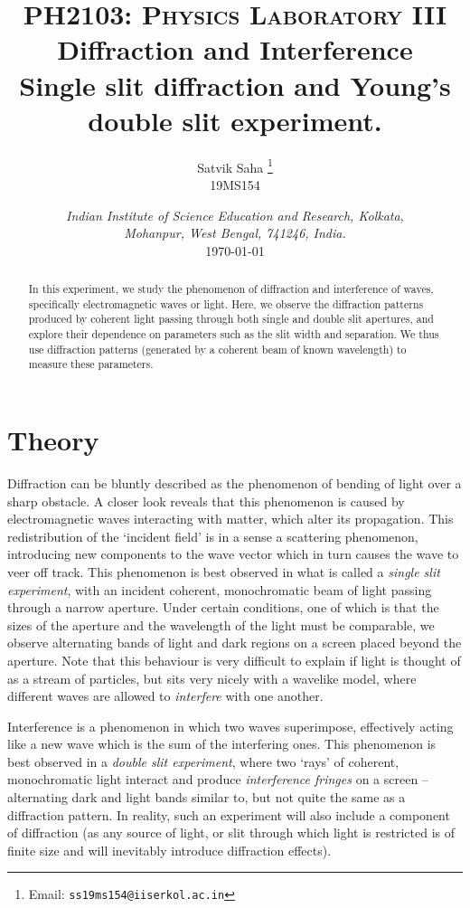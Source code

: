 \documentclass[11pt]{article}
\title{
        \Large\textsc{PH2103: Physics Laboratory III} \\
        \vspace{10pt}
        \Huge \textbf{Diffraction and Interference} \\
        \vspace{5pt}
        \large{Single slit diffraction and Young's double slit experiment.}
}
\author{
        \large Satvik Saha%
        \thanks{Email: \tt ss19ms154@iiserkol.ac.in}
        \\\textsc{\small 19MS154}
}
\date{\normalsize
        \textit{Indian Institute of Science Education and Research, Kolkata, \\
        Mohanpur, West Bengal, 741246, India.} \\
        \vspace{10pt}
        \today
}
\begin{document}
        \maketitle

        \begin{abstract}
                In this experiment, we study the phenomenon of diffraction and interference of waves, specifically electromagnetic waves or light.
                Here, we observe the diffraction patterns produced by coherent light passing through both single and double slit apertures,
                and explore their dependence on parameters such as the slit width and separation.
                We thus use diffraction patterns (generated by a coherent beam of known wavelength) to measure these parameters.
        \end{abstract}

        \section{Theory}
        
        Diffraction can be bluntly described as the phenomenon of bending of light over a sharp obstacle.
        A closer look reveals that this phenomenon is caused by electromagnetic waves interacting with matter, which alter its
        propagation. This redistribution of the `incident field' is in a sense a scattering phenomenon, introducing new components
        to the wave vector which in turn causes the wave to veer off track.
        This phenomenon is best observed in what is called a \textit{single slit experiment}, with an incident coherent, monochromatic
        beam of light passing through a narrow aperture. Under certain conditions, one of which is that the sizes of the aperture and
        the wavelength of the light must be comparable, we observe alternating bands of light and dark regions on a screen placed beyond
        the aperture. Note that this behaviour is very difficult to explain if light is thought of as a stream of particles, but
        sits very nicely with a wavelike model, where different waves are allowed to \textit{interfere} with one another.

        Interference is a phenomenon in which two waves superimpose, effectively acting like a new wave which is the sum of the 
        interfering ones. This phenomenon is best observed in a \textit{double slit experiment}, where two `rays' of 
        coherent, monochromatic light interact and produce \textit{interference fringes} on a screen -- alternating dark and
        light bands similar to, but not quite the same as a diffraction pattern. In reality, such an experiment will also
        include a component of diffraction (as any source of light, or slit through which light is restricted is of finite size and
        will inevitably introduce diffraction effects).
\end{document}
